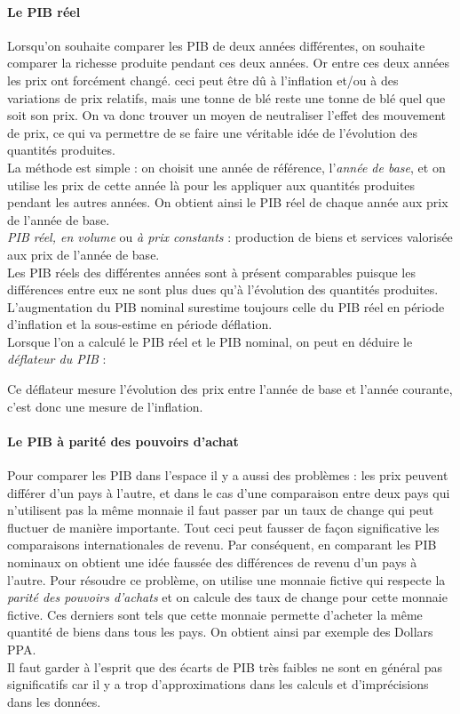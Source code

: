 \documentclass[10pt]{book}
\begin{document}
\paragraph{Le PIB réel}
Lorsqu'on souhaite comparer les PIB de deux années différentes, on souhaite comparer la richesse produite pendant ces deux années. Or entre ces deux années les prix ont forcément changé. ceci peut être dû à l'inflation et/ou à des variations de prix relatifs, mais une tonne de blé reste une tonne de blé quel que soit son prix. On va donc trouver un moyen de neutraliser l'effet des mouvement de prix, ce qui va permettre de se faire une véritable idée de l'évolution des quantités produites. \\
La méthode est simple : on choisit une année de référence, l'\textit{année de base}, et on utilise les prix de cette année là pour les appliquer aux quantités produites pendant les autres années. On obtient ainsi le PIB réel de chaque année aux prix de l'année de base. \\
\textit{PIB réel, en volume} ou \textit{à prix constants} : production de biens et services valorisée aux prix de l'année de base. \\
Les PIB réels des différentes années sont à présent comparables puisque les différences entre eux ne sont plus dues qu'à l'évolution des quantités produites. L'augmentation du PIB nominal surestime toujours celle du PIB réel en période d'inflation et la sous-estime en période déflation. \\
Lorsque l'on a calculé le PIB réel et le PIB nominal, on peut en déduire le \textit{déflateur du PIB} : 
\begin{center}
\end{center}
Ce déflateur mesure l'évolution des prix entre l'année de base et l'année courante, c'est donc une mesure de l'inflation.
\paragraph{Le PIB à parité des pouvoirs d'achat}
Pour comparer les PIB dans l'espace il y a aussi des problèmes : les prix peuvent différer d'un pays à l'autre, et dans le cas d'une comparaison entre deux pays qui n'utilisent pas la même monnaie il faut passer par un taux de change qui peut fluctuer de manière importante. Tout ceci peut fausser de façon significative les comparaisons internationales de revenu. Par conséquent, en comparant les PIB nominaux on obtient une idée faussée des différences de revenu d'un pays à l'autre. Pour résoudre ce problème, on utilise une monnaie fictive qui respecte la \textit{parité des pouvoirs d'achats} et on calcule des taux de change pour cette monnaie fictive. Ces derniers sont tels que cette monnaie permette d'acheter la même quantité de biens dans tous les pays. On obtient ainsi par exemple des Dollars PPA. \\
Il faut garder à l'esprit que des écarts de PIB très faibles ne sont en général pas significatifs car il y a trop d'approximations dans les calculs et d'imprécisions dans les données.
\end{document}

